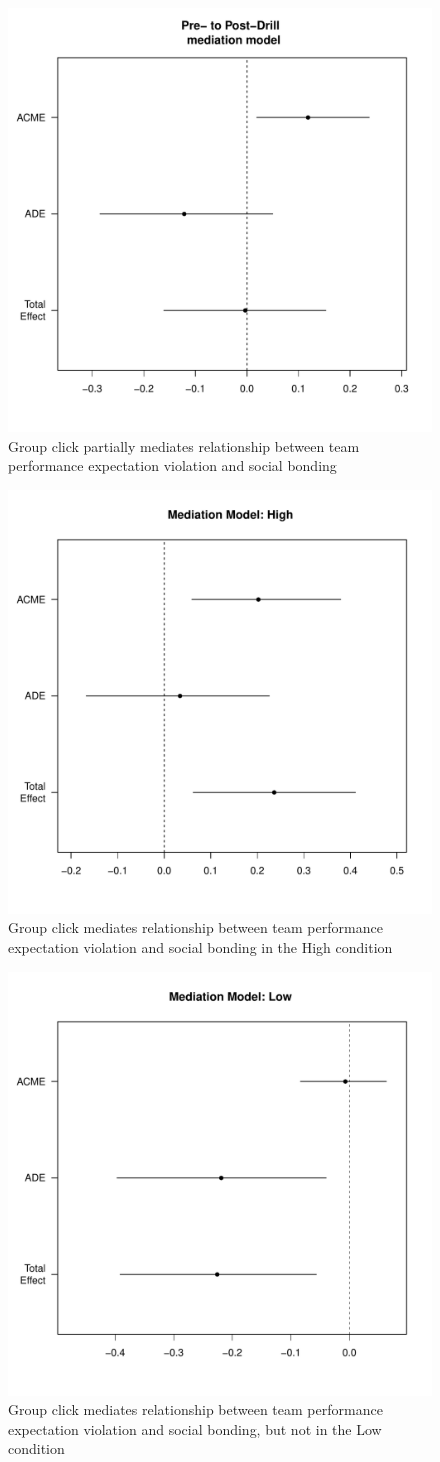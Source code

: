 \begin{figure}
  \centering
  \includegraphics[width=0.5\linewidth,keepaspectratio] {images/groupPerfExpClickChangeMedPlot}
  \caption{Group click partially mediates relationship between team performance expectation violation and social bonding}
  \label{fig:groupPerfExpClickChangeMedPlot}
\end{figure}

\begin{figure}
  \centering
  \includegraphics[width=0.5\linewidth,keepaspectratio] {images/groupPerfClickChangeMedPlotHigh}
  \caption{Group click mediates relationship between team performance expectation violation and social bonding in the High condition}
  \label{fig:groupPerfClickChangeMedPlotHigh}
\end{figure}

\begin{figure}
  \centering
  \includegraphics[width=0.5\linewidth,keepaspectratio] {images/groupPerfClickChangeMedPlotLow}
  \caption{Group click mediates relationship between team performance expectation violation and social bonding, but not in the Low condition}
  \label{fig:groupPerfClickChangeMedPlotLow}
\end{figure}

